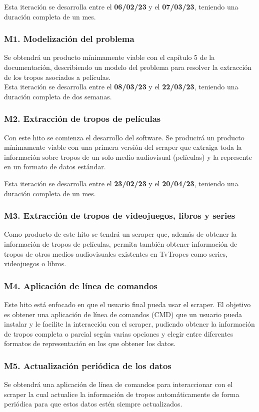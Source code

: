 Esta iteración se desarrolla entre el \textbf{06/02/23} y el \textbf{07/03/23}, teniendo una duración completa de un mes.
\subsubsection{M1. Modelización del problema}
Se obtendrá un producto mínimamente viable con el capítulo 5 de la documentación, describiendo un modelo del problema para resolver la extracción de los tropos asociados a películas.\\

Esta iteración se desarrolla entre el \textbf{08/03/23} y el \textbf{22/03/23}, teniendo una duración completa de dos semanas.
\subsubsection{M2. Extracción de tropos de películas}
Con este hito se comienza el desarrollo del software. Se producirá un producto mínimamente viable con una primera versión del scraper que extraiga toda la información sobre tropos de un solo medio audiovisual (películas) y la represente en un formato de datos estándar.

Esta iteración se desarrolla entre el \textbf{23/02/23} y el \textbf{20/04/23}, teniendo una duración completa de un mes.

\subsubsection{M3. Extracción de tropos de videojuegos, libros y series}
Como producto de este hito se tendrá un scraper que, además de obtener la información de tropos de películas, permita también obtener información de tropos de otros medios audiovisuales existentes en TvTropes como series, videojuegos o libros.

\subsubsection{M4. Aplicación de línea de comandos}
Este hito está enfocado en que el usuario final pueda usar el scraper. El objetivo es obtener una aplicación de línea de comandos (CMD) que un usuario pueda instalar y le facilite la interacción con el scraper, pudiendo obtener la información de tropos completa o parcial según varias opciones y elegir entre diferentes formatos de representación en los que obtener los datos.

\subsubsection{M5. Actualización periódica de los datos}
Se obtendrá una aplicación de línea de comandos para interaccionar con el scraper la cual actualice la información de tropos automáticamente de forma periódica para que estos datos estén siempre actualizados. 

